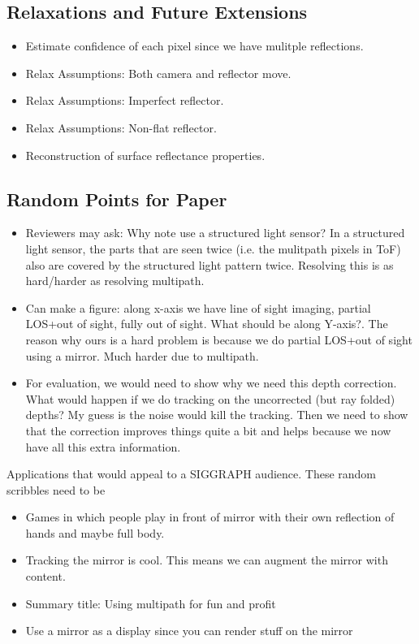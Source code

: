 \subsection{Relaxations and Future Extensions}
\begin{itemize}
\item Estimate confidence of each pixel since we have mulitple reflections.
\item Relax Assumptions: Both camera and reflector move.
\item Relax Assumptions: Imperfect reflector.
\item Relax Assumptions: Non-flat reflector.
\item Reconstruction of surface reflectance properties.
\end{itemize}

\subsection{Random Points for Paper}
\begin{itemize}
\item Reviewers may ask: Why note use a structured light sensor? In a structured light sensor, the parts that are seen twice (i.e. the mulitpath pixels in ToF) also are covered by the structured light pattern twice. Resolving this is as hard/harder as resolving multipath. 
\item Can make a figure: along x-axis we have line of sight imaging, partial LOS+out of sight, fully out of sight. What should be along Y-axis?. The reason why ours is a hard problem is because we do partial LOS+out of sight using a mirror. Much harder due to multipath.
\item For evaluation, we would need to show why we need this depth correction. What would happen if we do tracking on the uncorrected (but ray folded) depths? My guess is the noise would kill the tracking. Then we need to show that the correction improves things quite a bit and helps because we now have all this extra information.
\end{itemize}

Applications that would appeal to a SIGGRAPH audience. These random scribbles need to be 
\begin{itemize}
\item Games in which people play in front of mirror with their own reflection of hands and maybe full body.
\item Tracking the mirror is cool. This means we can augment the mirror with content.
\item Summary title: Using multipath for fun and profit
\item Use a mirror as a display since you can render stuff on the mirror
\end{itemize}

